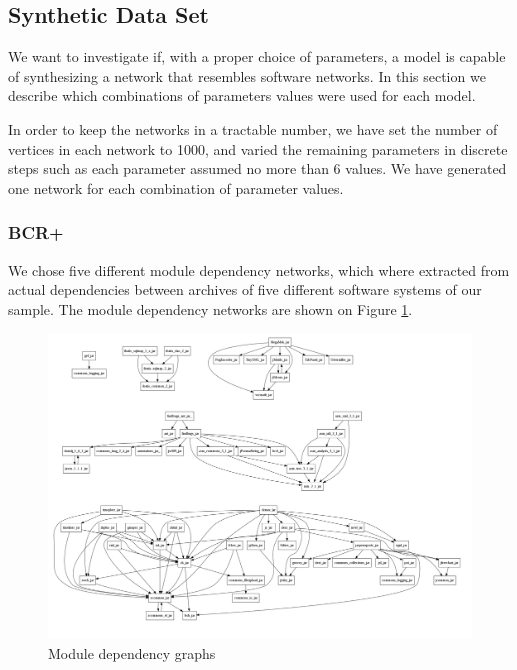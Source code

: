 \subsection{Synthetic Data Set}

We want to investigate if, with a proper choice of parameters, a model is
capable of synthesizing a network that resembles software networks. In this
section we describe which combinations of parameters values were used for each
model.


In order to keep the networks in a tractable number, we have set the number of
vertices in each network to 1000, and varied the remaining parameters in
discrete steps such as each parameter assumed no more than 6 values. We have
generated one network for each combination of parameter values.


\subsubsection{BCR+}

We chose five different module dependency networks, which where extracted from
actual dependencies between archives of five different software systems of our
sample. The module dependency networks are shown on Figure
\ref{fig:architectures}. 

\begin{figure}[!t]
\centering
\includegraphics[width=1.0\textwidth]{architectures}
\caption{Module dependency graphs}
\label{fig:architectures}
\end{figure}

